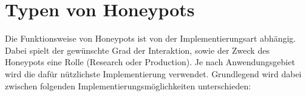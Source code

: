 \section{Typen von Honeypots}
Die Funktionsweise von Honeypots ist von der Implementierungsart abhängig. Dabei spielt der gewünschte Grad der Interaktion, sowie der Zweck des Honeypots eine Rolle (Research oder Production). Je nach Anwendungsgebiet wird die dafür nützlichste Implementierung verwendet. Grundlegend wird dabei zwischen folgenden Implementierungsmöglichkeiten unterschieden:





 
